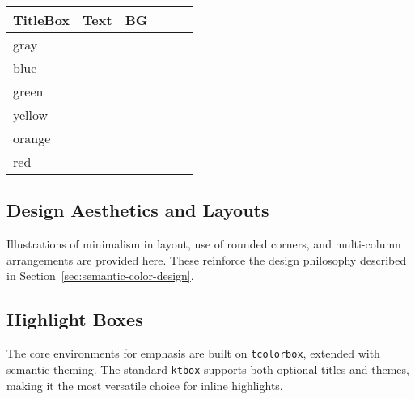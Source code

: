 \documentclass[12pt,onecolumn]{article}
\begin{document}
\begin{table}[ht]
\begin{subtable}[t]{0.48\textwidth}
\begin{tabular}{@{}llllll@{}}
          \textcolor{ktblue-title}{\textbf{TitleBox}} &
          \textcolor{ktblue-title}{\textbf{Text}} &
          \textcolor{ktblue-title}{\textbf{BG}} \\
          \midrule
          gray   & \cellcolor{ktgray-title-dark}   & \cellcolor{ktgray-border-dark}   & \cellcolor{ktgray-titlebox-dark}   & \cellcolor{ktgray-text-dark}   & \cellcolor{ktgray-bg-dark} \\
          blue   & \cellcolor{ktblue-title-dark}   & \cellcolor{ktblue-border-dark}   & \cellcolor{ktblue-titlebox-dark}   & \cellcolor{ktblue-text-dark}   & \cellcolor{ktblue-bg-dark} \\
          green  & \cellcolor{ktgreen-title-dark}  & \cellcolor{ktgreen-border-dark}  & \cellcolor{ktgreen-titlebox-dark}  & \cellcolor{ktgreen-text-dark}  & \cellcolor{ktgreen-bg-dark} \\
          yellow & \cellcolor{ktyellow-title-dark} & \cellcolor{ktyellow-border-dark} & \cellcolor{ktyellow-titlebox-dark} & \cellcolor{ktyellow-text-dark} & \cellcolor{ktyellow-bg-dark} \\
          orange & \cellcolor{ktorange-title-dark} & \cellcolor{ktorange-border-dark} & \cellcolor{ktorange-titlebox-dark} & \cellcolor{ktorange-text-dark} & \cellcolor{ktorange-bg-dark} \\
          red    & \cellcolor{ktred-title-dark}    & \cellcolor{ktred-border-dark}    & \cellcolor{ktred-titlebox-dark}    & \cellcolor{ktred-text-dark}    & \cellcolor{ktred-bg-dark} \\
          \bottomrule
        \end{tabular}
      \end{subtable}

    \end{table}

  \subsection{Design Aesthetics and Layouts}
  \label{sec:design-aesthetics}
    Illustrations of minimalism in layout, use of rounded corners, and multi-column arrangements are provided here. These reinforce the design philosophy described in Section~\ref{sec:semantic-color-design}.

  \subsection{Highlight Boxes}
  \label{sec:structural-boxes}
    The core environments for emphasis are built on \texttt{tcolorbox}, extended with semantic theming. The standard \texttt{ktbox} supports both optional titles and themes, making it the most versatile choice for inline highlights.
\end{document}
